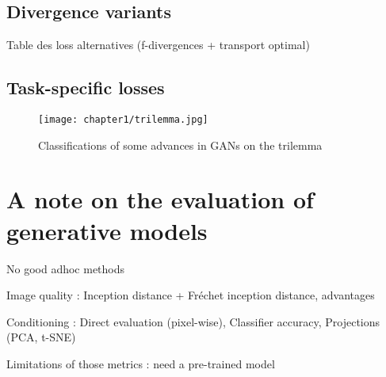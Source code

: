 \subsection{Divergence variants}
Table des loss alternatives (f-divergences + transport optimal)

\subsection{Task-specific losses}

\begin{figure}
	\texttt{[image: chapter1/trilemma.jpg]}
	\caption{Classifications of some advances in GANs on the trilemma}
\end{figure}

\section{A note on the  evaluation of generative models}

No good adhoc methods

Image quality : Inception distance + Fréchet inception distance, advantages

Conditioning : Direct evaluation (pixel-wise), Classifier accuracy, Projections (PCA, t-SNE)

Limitations of those metrics : need a pre-trained model


